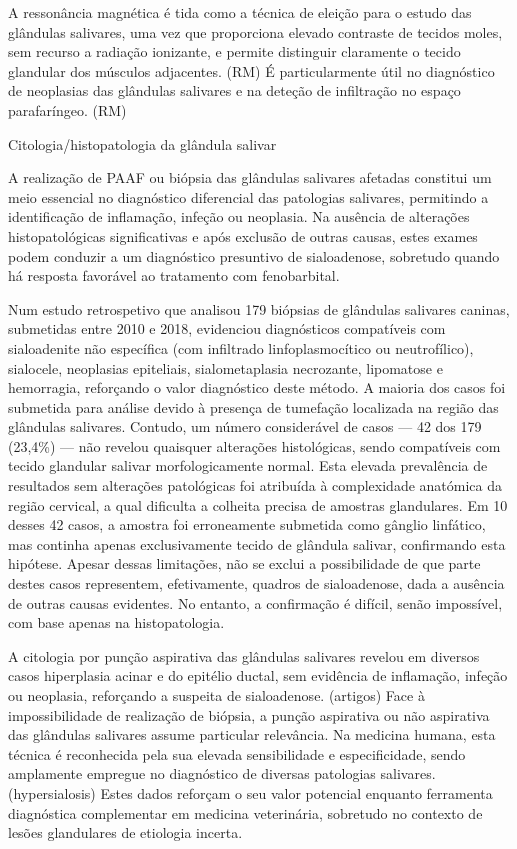 A ressonância magnética é tida como a técnica de eleição para o estudo das glândulas salivares, uma vez que proporciona elevado contraste de tecidos moles, sem recurso a radiação ionizante, e permite distinguir claramente o tecido glandular dos músculos adjacentes. (RM) É particularmente útil no diagnóstico de neoplasias das glândulas salivares e na deteção de infiltração no espaço parafaríngeo. (RM)


Citologia/histopatologia da glândula salivar


A realização de PAAF ou biópsia das glândulas salivares afetadas constitui um meio essencial no diagnóstico diferencial das patologias salivares, permitindo a identificação de inflamação, infeção ou neoplasia. Na ausência de alterações histopatológicas significativas e após exclusão de outras causas, estes exames podem conduzir a um diagnóstico presuntivo de sialoadenose, sobretudo quando há resposta favorável ao tratamento com fenobarbital.


Num estudo retrospetivo que analisou 179 biópsias de glândulas salivares caninas, submetidas entre 2010 e 2018, evidenciou diagnósticos compatíveis com sialoadenite não específica (com infiltrado linfoplasmocítico ou neutrofílico), sialocele, neoplasias epiteliais, sialometaplasia necrozante, lipomatose e hemorragia, reforçando o valor diagnóstico deste método. A maioria dos casos foi submetida para análise devido à presença de tumefação localizada na região das glândulas salivares. Contudo, um número considerável de casos — 42 dos 179 (23,4\%) — não revelou quaisquer alterações histológicas, sendo compatíveis com tecido glandular salivar morfologicamente normal. Esta elevada prevalência de resultados sem alterações patológicas foi atribuída à complexidade anatómica da região cervical, a qual dificulta a colheita precisa de amostras glandulares. Em 10 desses 42 casos, a amostra foi erroneamente submetida como gânglio linfático, mas continha apenas exclusivamente tecido de glândula salivar, confirmando esta hipótese.
Apesar dessas limitações, não se exclui a possibilidade de que parte destes casos representem, efetivamente, quadros de sialoadenose, dada a ausência de outras causas evidentes. No entanto, a confirmação é difícil, senão impossível, com base apenas na histopatologia.


A citologia por punção aspirativa das glândulas salivares revelou em diversos casos hiperplasia acinar e do epitélio ductal, sem evidência de inflamação, infeção ou neoplasia, reforçando a suspeita de sialoadenose. (artigos) Face à impossibilidade de realização de biópsia, a punção aspirativa ou não aspirativa das glândulas salivares assume particular relevância. Na medicina humana, esta técnica é reconhecida pela sua elevada sensibilidade e especificidade, sendo amplamente empregue no diagnóstico de diversas patologias salivares. (hypersialosis) Estes dados reforçam o seu valor potencial enquanto ferramenta diagnóstica complementar em medicina veterinária, sobretudo no contexto de lesões glandulares de etiologia incerta.


